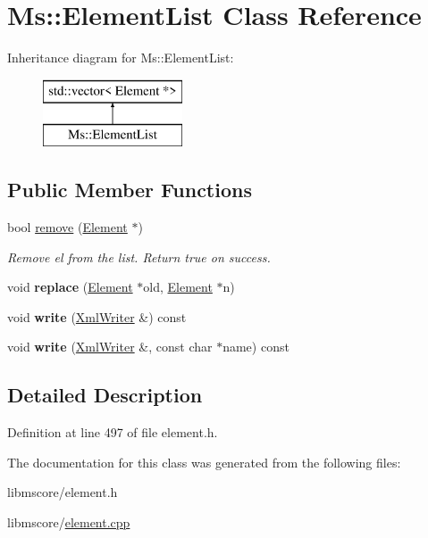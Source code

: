 \hypertarget{class_ms_1_1_element_list}{}\section{Ms\+:\+:Element\+List Class Reference}
\label{class_ms_1_1_element_list}
Inheritance diagram for Ms\+:\+:Element\+List\+:\begin{figure}[H]
\begin{center}
\leavevmode
\includegraphics[height=2.000000cm]{class_ms_1_1_element_list}
\end{center}
\end{figure}
\subsection*{Public Member Functions}
\begin{DoxyCompactItemize}
\item 
\mbox{\label{class_ms_1_1_element_list_ace6e9dd48aaec6c43014153b4697d9e3}} 
bool \hyperlink{class_ms_1_1_element_list_ace6e9dd48aaec6c43014153b4697d9e3}{remove} (\hyperlink{class_ms_1_1_element}{Element} $\ast$)
\begin{DoxyCompactList}\small\item\em Remove {\itshape el} from the list. Return true on success. \end{DoxyCompactList}\item 
\mbox{\label{class_ms_1_1_element_list_a99e20c925f2d459920dbb423b5f34259}} 
void {\bfseries replace} (\hyperlink{class_ms_1_1_element}{Element} $\ast$old, \hyperlink{class_ms_1_1_element}{Element} $\ast$n)
\item 
\mbox{\label{class_ms_1_1_element_list_ac8e864e4d80cdfe3bbe33bfd7d56e486}} 
void {\bfseries write} (\hyperlink{class_ms_1_1_xml_writer}{Xml\+Writer} \&) const
\item 
\mbox{\label{class_ms_1_1_element_list_a3c44c6c04703e058ef6966e4eb0de05f}} 
void {\bfseries write} (\hyperlink{class_ms_1_1_xml_writer}{Xml\+Writer} \&, const char $\ast$name) const
\end{DoxyCompactItemize}


\subsection{Detailed Description}


Definition at line 497 of file element.\+h.



The documentation for this class was generated from the following files\+:\begin{DoxyCompactItemize}
\item 
libmscore/element.\+h\item 
libmscore/\hyperlink{element_8cpp}{element.\+cpp}\end{DoxyCompactItemize}
